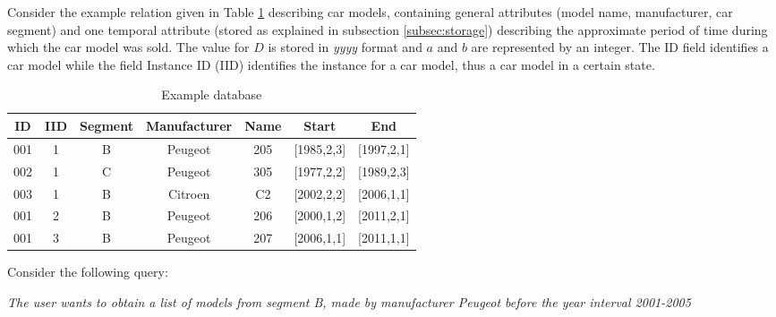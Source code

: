\begin{example} 

Consider the example relation given in Table \ref{tb:car-models} describing car models, containing general attributes (model name, manufacturer, car segment) and one temporal attribute (stored as explained in subsection \ref{subsec:storage}) describing the approximate period of time during which the car model was sold. The value for $D$ is stored in \emph{yyyy} format and $a$ and $b$ are represented by an integer. The ID field identifies a car model while the field Instance ID (IID) identifies the instance for a car model, thus a car model in a certain state.

\end{example}
\begin{table}[h]
\centering
\caption{Example database}
\begin{tabular}{c c c c c c c}
\hline
ID & IID & Segment & Manufacturer & Name & Start & End  \\ [0.5ex]
\hline
001 & 1 & B & Peugeot & 205 & [1985,2,3] & [1997,2,1] \\
002 & 1 & C & Peugeot & 305 & [1977,2,2] & [1989,2,3] \\
003 & 1 & B & Citroen & C2 & [2002,2,2] & [2006,1,1] \\
001 & 2 & B & Peugeot & 206 & [2000,1,2] & [2011,2,1] \\
001 & 3 & B & Peugeot & 207 & [2006,1,1] & [2011,1,1]\\
\hline
\end{tabular}
\vspace{10pt}
\label{tb:car-models}
\vspace{-30pt}
\end{table}

Consider the following query:
\begin{center}
\emph{The user wants to obtain a list of models from segment B, made by manufacturer Peugeot before the year interval 2001-2005}\\
\end{center}

